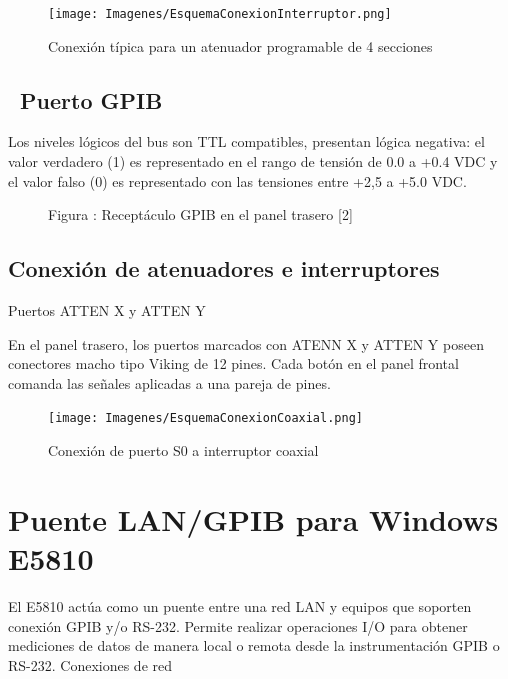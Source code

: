 \begin{figure}
	\centering
	\begin{minipage}{8.841cm}
		\texttt{[image: Imagenes/EsquemaConexionInterruptor.png]}
		\caption{Conexión típica para un atenuador programable de 4 secciones}
		\label{Fid:ConexionInterruptor11713}				
	\end{minipage}
\end{figure}

\subsection{\ Puerto GPIB }
Los niveles lógicos del bus son TTL compatibles, presentan lógica negativa: el valor verdadero (1) es representado en el rango de tensión de 0.0 a +0.4 VDC y el valor falso (0) es representado con las tensiones entre +2,5 a +5.0 VDC.

\begin{figure}
	\centering
	\begin{minipage}{10.028cm}
		Figura : Receptáculo GPIB en el panel trasero [2]
	\end{minipage}
\end{figure}		

\subsection{Conexión de atenuadores e interruptores}
Puertos ATTEN X y ATTEN Y

En el panel trasero, los puertos marcados con ATENN X y ATTEN Y poseen conectores macho tipo Viking de 12 pines. Cada
botón en el panel frontal comanda las señales aplicadas a una pareja de pines.

\begin{figure}
	\centering
	\begin{minipage}{11.456cm}			
		\texttt{[image: Imagenes/EsquemaConexionCoaxial.png]}
		\caption{Conexión de puerto S0 a interruptor coaxial}
		\label{Fig:ConexionCoaxial11713}
	\end{minipage}
\end{figure}


\section{Puente LAN/GPIB para Windows E5810 }

El E5810 actúa como un puente entre una red LAN y equipos que soporten conexión GPIB y/o RS-232. Permite realizar operaciones I/O para obtener mediciones de datos de manera local o remota desde la instrumentación GPIB o RS-232.		
Conexiones de red

